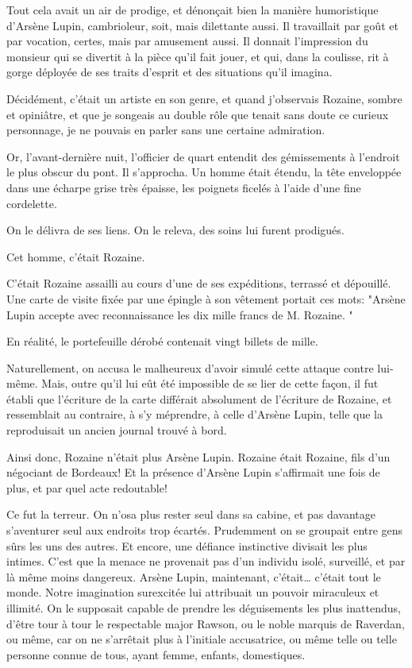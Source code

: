 \documentclass[12pt,a4paper]{article}
\begin{document}
Tout cela avait un air de prodige, et dénonçait bien la manière humoristique d’Arsène Lupin, cambrioleur, soit, mais dilettante aussi. Il travaillait par goût et par vocation, certes, mais par amusement aussi. Il donnait l’impression du monsieur qui se divertit à la pièce qu’il fait jouer, et qui, dans la coulisse, rit à gorge déployée de ses traits d’esprit et des situations qu’il imagina.

Décidément, c’était un artiste en son genre, et quand j’observais Rozaine, sombre et opiniâtre, et que je songeais au double rôle que tenait sans doute ce curieux personnage, je ne pouvais en parler sans une certaine admiration.

Or, l’avant-dernière nuit, l’officier de quart entendit des gémissements à l’endroit le plus obscur du pont. Il s’approcha. Un homme était étendu, la tête enveloppée dans une écharpe grise très épaisse, les poignets ficelés à l’aide d’une fine cordelette.

On le délivra de ses liens. On le releva, des soins lui furent prodigués.

Cet homme, c’était Rozaine.

C’était Rozaine assailli au cours d’une de ses expéditions, terrassé et dépouillé. Une carte de visite fixée par une épingle à son vêtement portait ces mots: "Arsène Lupin accepte avec reconnaissance les dix mille francs de M. Rozaine. "

En réalité, le portefeuille dérobé contenait vingt billets de mille.

Naturellement, on accusa le malheureux d’avoir simulé cette attaque contre lui-même. Mais, outre qu’il lui eût été impossible de se lier de cette façon, il fut établi que l’écriture de la carte différait absolument de l’écriture de Rozaine, et ressemblait au contraire, à s’y méprendre, à celle d’Arsène Lupin, telle que la reproduisait un ancien journal trouvé à bord.

Ainsi donc, Rozaine n’était plus Arsène Lupin. Rozaine était Rozaine, fils d’un négociant de Bordeaux! Et la présence d’Arsène Lupin s’affirmait une fois de plus, et par quel acte redoutable!

Ce fut la terreur. On n’osa plus rester seul dans sa cabine, et pas davantage s’aventurer seul aux endroits trop écartés. Prudemment on se groupait entre gens sûrs les uns des autres. Et encore, une défiance instinctive divisait les plus intimes. C’est que la menace ne provenait pas d’un individu isolé, surveillé, et par là même moins dangereux. Arsène Lupin, maintenant, c’était… c’était tout le monde. Notre imagination surexcitée lui attribuait un pouvoir miraculeux et illimité. On le supposait capable de prendre les déguisements les plus inattendus, d’être tour à tour le respectable major Rawson, ou le noble marquis de Raverdan, ou même, car on ne s’arrêtait plus à l’initiale accusatrice, ou même telle ou telle personne connue de tous, ayant femme, enfants, domestiques.
\end{document}
